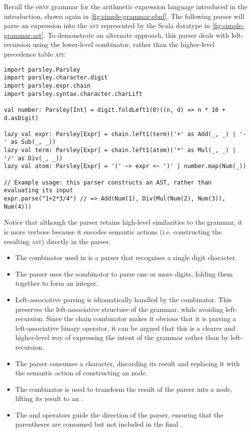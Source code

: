 \documentclass[../../main.tex]{subfiles}
\begin{document}
\noindent %
Recall the e\textsc{bnf} grammar for the arithmetic expression language introduced in the introduction, shown again in \cref{fig:simple-grammar-ebnf}.
The following parser will parse an expression into the \textsc{ast} represented by the Scala datatype in \cref{fig:simple-grammar-ast}.
To demonstrate an alternate approach, this parser deals with left-recursion using the lower-level  combinator, rather than the higher-level precedence table \textsc{api}:
\begin{verbatim}
import parsley.Parsley
import parsley.character.digit
import parsley.expr.chain
import parsley.syntax.character.charLift

val number: Parsley[Int] = digit.foldLeft1(0)((n, d) => n * 10 + d.asDigit)

lazy val expr: Parsley[Expr] = chain.left1(term)('+' as Add(_, _) | '-' as Sub(_, _))
lazy val term: Parsley[Expr] = chain.left1(atom)('*' as Mul(_, _) | '/' as Div(_, _))
lazy val atom: Parsley[Expr] = '(' ~> expr <~ ')' | number.map(Num(_))

// Example usage: this parser constructs an AST, rather than evaluating its input
expr.parse("1+2*3/4") // => Add(Num(1), Div(Mul(Num(2), Num(3)), Num(4)))
\end{verbatim}
\vspace{1ex} %
%
Notice that although the parser retains high-level similarities to the grammar, it is more verbose because it encodes semantic actions (i.e. constructing the resulting \textsc{ast}) directly in the parser.
\begin{itemize}
  \item The  combinator used in  is a parser that recognises a single digit character.
  \item The  parser uses the  combinator to parse one or more digits, folding them together to form an integer.
  \item Left-associative parsing is idiomatically handled by the  combinator. This preserves the left-associative structure of the grammar, while avoiding left-recursion. Since the chain combinator makes it obvious that it is parsing a left-associative binary operator, it can be argued that this is a clearer and higher-level way of expressing the intent of the grammar rather than by left-recursion.
  \item The  parser consumes a \scala{+} character, discarding its result and replacing it with the semantic action of constructing an  node.
  \item The  combinator is used to transform the result of the  parser into a  node, lifting its  result to an .
  \item The \scala{~>} and \scala{<~} operators guide the direction of the parser, ensuring that the parentheses are consumed but not included in the final .
\end{itemize}
\end{document}
